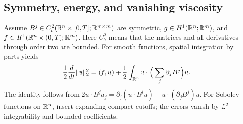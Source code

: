 \subsection{Symmetry, energy, and vanishing viscosity}
Assume $B^j\in C_b^2(\mathbb{R}^n\times[0,T];\mathbb{R}^{m\times m})$ are symmetric,
$g\in H^1(\mathbb{R}^n;\mathbb{R}^m)$, and $f\in H^1(\mathbb{R}^n\times(0,T);\mathbb{R}^m)$.
Here $C_b^2$ means that the matrices and all derivatives through order
two are bounded. For smooth functions, spatial integration by parts yields
\begin{equation}\label{eq:7-system-energy}
 \frac12\frac d{dt}\|u\|_2^2
 =(f,u)+\frac12\int_{\mathbb{R}^n}u\cdot\Big(\sum_j\partial_jB^j\Big)u.
\end{equation}
The identity follows from
$2u\cdot B^ju_j=\partial_j(u\cdot B^ju)-u\cdot(\partial_jB^j)u$.
For Sobolev functions on $\mathbb{R}^n$, insert expanding compact cutoffs;
the errors vanish by $L^2$ integrability and bounded coefficients.
\Needspace{55mm}

